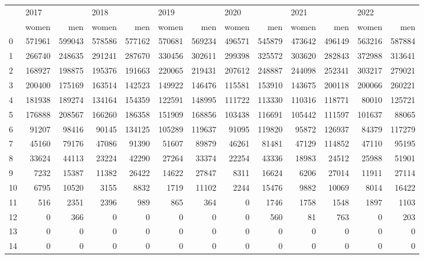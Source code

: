 \begin{tabular}{lrrrrrrrrrrrr}
\toprule
{} & \multicolumn{2}{l}{2017} & \multicolumn{2}{l}{2018} & \multicolumn{2}{l}{2019} & \multicolumn{2}{l}{2020} & \multicolumn{2}{l}{2021} & \multicolumn{2}{l}{2022} \\
{} &   women &     men &   women &     men &   women &     men &   women &     men &   women &     men &   women &     men \\
\midrule
0  &  571961 &  599043 &  578586 &  577162 &  570681 &  569234 &  496571 &  545879 &  473642 &  496149 &  563216 &  587884 \\
1  &  266740 &  248635 &  291241 &  287670 &  330456 &  302611 &  299398 &  325572 &  303620 &  282843 &  372988 &  313641 \\
2  &  168927 &  198875 &  195376 &  191663 &  220065 &  219431 &  207612 &  248887 &  244098 &  252341 &  303217 &  279021 \\
3  &  200400 &  175169 &  163514 &  142523 &  149922 &  146476 &  115581 &  153910 &  143675 &  200118 &  200066 &  260221 \\
4  &  181938 &  189274 &  134164 &  154359 &  122591 &  148995 &  111722 &  113330 &  110316 &  118771 &   80010 &  125721 \\
5  &  176888 &  208567 &  166260 &  186358 &  151909 &  168856 &  103438 &  116691 &  105442 &  111597 &  101637 &   88065 \\
6  &   91207 &   98416 &   90145 &  134125 &  105289 &  119637 &   91095 &  119820 &   95872 &  126937 &   84379 &  117279 \\
7  &   45160 &   79176 &   47086 &   91390 &   51607 &   89879 &   46261 &   81481 &   47129 &  114852 &   47110 &   95195 \\
8  &   33624 &   44113 &   23224 &   42290 &   27264 &   33374 &   22254 &   43336 &   18983 &   24512 &   25988 &   51901 \\
9  &    7232 &   15387 &   11382 &   26422 &   14622 &   27847 &    8311 &   16624 &    6206 &   27014 &   11911 &   27114 \\
10 &    6795 &   10520 &    3155 &    8832 &    1719 &   11102 &    2244 &   15476 &    9882 &   10069 &    8014 &   16422 \\
11 &     516 &    2351 &    2396 &     989 &     865 &     364 &       0 &    1746 &    1758 &    1548 &    1897 &    1103 \\
12 &       0 &     366 &       0 &       0 &       0 &       0 &       0 &     560 &      81 &     763 &       0 &     203 \\
13 &       0 &       0 &       0 &       0 &       0 &       0 &       0 &       0 &       0 &       0 &       0 &       0 \\
14 &       0 &       0 &       0 &       0 &       0 &       0 &       0 &       0 &       0 &       0 &       0 &       0 \\
\bottomrule
\end{tabular}
